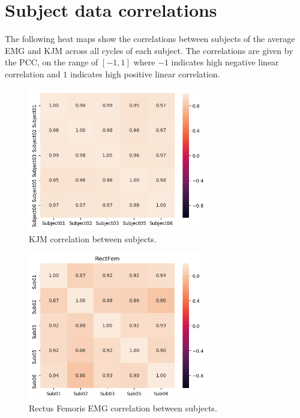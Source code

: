 \section{Subject data correlations}
\label{sec:A-data-correlations}
The following heat maps show the correlations between subjects of the average \ac{EMG} and \ac{KJM} across all cycles of each subject.
The correlations are given by the \ac{PCC}, on the range of $[-1, 1]$ where $-1$ indicates high negative linear correlation and $1$ indicates high positive linear correlation.
\begin{figure}[ht!]
    \centering
    \includegraphics[width=0.7\textwidth]{img/results/correlations/KJM_correlation_between_subjects.png}
    \caption{\ac{KJM} correlation between subjects.}
    \label{fig:kjm-correlation}
\end{figure}
\begin{figure}[ht!]
    \centering
    \includegraphics[width=0.7\textwidth]{img/results/correlations/RectFem_correlation_between_subjects.png}
    \caption{Rectus Femoris \ac{EMG} correlation between subjects.}
    \label{fig:rectfem-correlation}
\end{figure}
